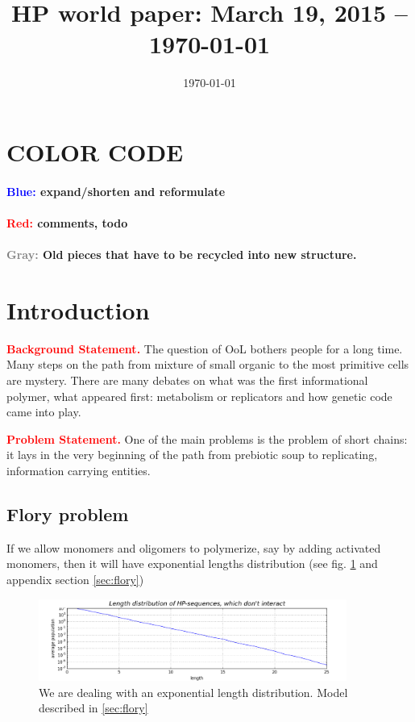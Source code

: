 \documentclass[12pt]{paper}
\title{HP world paper: March 19, 2015 -- \today}
\author{}
\date{\today}
\newcommand{\red}[1]{\textcolor{red}{#1}}
\newcommand{\gray}[1]{\textcolor{gray}{#1}}
\begin{document}
 \maketitle
 \tableofcontents
 
 \section*{COLOR CODE}
\paragraph{\textcolor{blue}{Blue: } expand/shorten and reformulate}
\paragraph{\red{Red: }comments, todo}
\paragraph{\gray{Gray: }Old pieces that have to be recycled into new structure.}
 
\section{Introduction} 

\noindent\red{\textbf{Background Statement.}} The question of OoL bothers people for a long time. 
Many steps on the path from mixture of small organic to the most primitive cells are mystery. 
There are many debates on what was the first informational polymer, what appeared first: 
metabolism or replicators and how genetic code came into play.

\noindent\red{\textbf{Problem Statement.}} One of the main problems is the problem of short 
chains: it lays in the very beginning of the path from prebiotic soup to replicating, information 
carrying entities. 
\subsection{Flory problem}
If we allow monomers and oligomers to polymerize, say by adding activated monomers, then it will 
have exponential lengths distribution (see fig. \ref{fig:flory} and appendix section 
\ref{sec:flory})

\begin{figure}[h!]
  \centering
  \includegraphics[width=0.9\textwidth]{pictures/flory.png} 
  \caption{We are dealing with an exponential length distribution. 
    Model described in \ref{sec:flory}}
  \label{fig:flory}
\end{figure}
\end{document}
